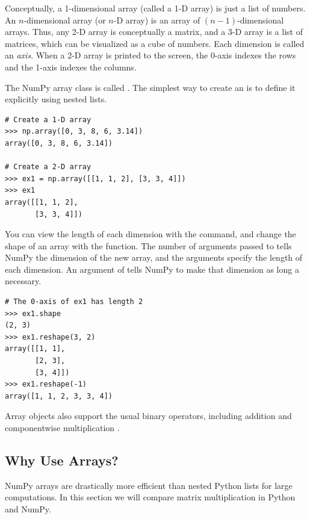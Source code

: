 Conceptually, a 1-dimensional array (called a 1-D array) is just a list of numbers. 
An $n$-dimensional array (or $n$-D array) is an array of $(n-1)$-dimensional arrays. 
Thus, any 2-D array is conceptually a matrix, and a 3-D array is a list of matrices, which can be visualized as a cube of numbers. 
Each dimension is called an \emph{axis}. 
When a 2-D array is printed to the screen, the 0-axis indexes the rows and the 1-axis indexes the columns.

The NumPy array class is called . 
The simplest way to create an  is to define it explicitly using nested lists.
\begin{lstlisting}
# Create a 1-D array
>>> np.array([0, 3, 8, 6, 3.14])
array([0, 3, 8, 6, 3.14]) 

# Create a 2-D array
>>> ex1 = np.array([[1, 1, 2], [3, 3, 4]])
>>> ex1
array([[1, 1, 2],
       [3, 3, 4]])

\end{lstlisting} 

You can view the length of each dimension with the  command, and change the shape of an array with the  function. 
The number of arguments passed to  tells NumPy the dimension of the new array, and the arguments specify the length of each dimension. 
An argument of  tells NumPy to make that dimension as long a necessary.
\begin{lstlisting}
# The 0-axis of ex1 has length 2
>>> ex1.shape
(2, 3)
>>> ex1.reshape(3, 2)
array([[1, 1],
       [2, 3],
       [3, 4]])
>>> ex1.reshape(-1)
array([1, 1, 2, 3, 3, 4])
\end{lstlisting}

Array objects also support the usual binary operators, including addition \li{+} and componentwise multiplication \li{*}.

\subsection*{Why Use Arrays?}
NumPy arrays are drastically more efficient than nested Python lists for large computations. 
In this section we will compare matrix multiplication in Python and NumPy.

